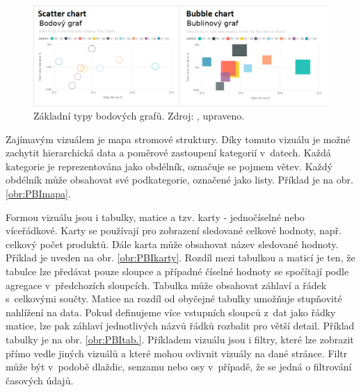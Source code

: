 \begin{figure}[h!]
    \centering
    \captionsetup{justification=centering}
    \includegraphics[width=.9\textwidth]{obrazky/PBIteorie/power-bi-compare-charts.png}
    \caption{Základní typy bodových grafů. 
    Zdroj: \cite{bib:PBI}, upraveno.}
    \label{obr:PBI:grafybod}
\end{figure}

Zajímavým vizuálem je mapa stromové struktury. Díky tomuto vizuálu je možné zachytit hierarchická data a poměrové zastoupení kategorií v~datech. Každá kategorie je reprezentována jako obdélník, označuje se pojmem větev. Každý obdélník může obsahovat své podkategorie, označené jako listy. Příklad je na obr. \ref*{obr:PBImapa}.

Formou vizuálu jsou i tabulky, matice a tzv. karty - jednočíselné nebo víceřádkové. Karty se používají pro zobrazení sledované celkové hodnoty, např. celkový počet produktů. Dále karta může obsahovat název sledované hodnoty. Příklad je uveden na obr. \ref*{obr:PBIkarty}. 
Rozdíl mezi tabulkou a maticí je ten, že tabulce lze předávat pouze sloupce a případné číselné hodnoty se spočítají podle agregace v~předchozích sloupcích. Tabulka může obsahovat záhlaví a řádek s~celkovými součty. Matice na rozdíl od obyčejné tabulky umožňuje stupňovité nahlížení na data. Pokud definujeme více vstupních sloupců z~dat jako řádky matice, lze pak záhlaví jednotlivých názvů řádků rozbalit pro větší detail. Příklad tabulky je na obr.         \ref*{obr:PBItab.}. 
Příkladem vizuálu jsou i filtry, které lze zobrazit přímo vedle jiných vizuálů a které mohou ovlivnit vizuály na dané stránce. Filtr může být v~podobě dlaždic, senzamu nebo osy v~případě, že se jedná o filtrování časových údajů.

